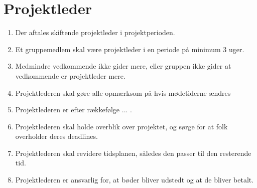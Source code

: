 \section{Projektleder}
\begin{enumerate}
\item{Der aftales skiftende projektleder i projektperioden.}
\item{Et gruppemedlem skal være projektleder i en periode på minimum 3 uger.}
\item{Medmindre vedkommende ikke gider mere, eller gruppen ikke gider at
vedkommende er projektleder mere.}
\item{Projektlederen skal gøre alle opmærksom på hvis mødetiderne ændres}
\item{Projektlederen er efter rækkefølge ... .}
\item{Projektlederen skal holde overblik over projektet, og sørge for at folk overholder deres deadlines.}
\item{Projektlederen skal revidere tidsplanen, således den passer til den resterende tid.}
\item{Projektlederen er ansvarlig for, at bøder bliver udstedt og at de bliver betalt.}
\end{enumerate}
